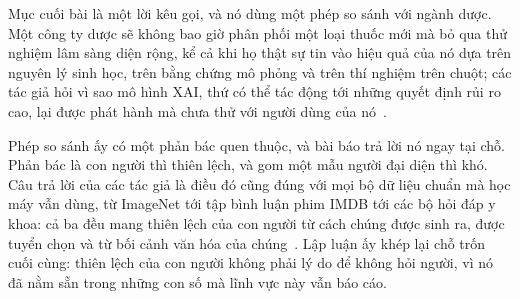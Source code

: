 %
Mục cuối bài là một lời kêu gọi, và nó dùng một phép so sánh với ngành dược.
Một công ty dược sẽ không bao giờ phân phối một loại thuốc mới mà bỏ qua thử
nghiệm lâm sàng diện rộng, kể cả khi họ thật sự tin vào hiệu quả của nó dựa
trên nguyên lý sinh học, trên bằng chứng mô phỏng và trên thí nghiệm trên
chuột; các tác giả hỏi vì sao mô hình XAI, thứ có thể tác động tới những quyết
định rủi ro cao, lại được phát hành mà chưa thử với người dùng của
nó~\autocite{p24humangap}.

Phép so sánh ấy có một phản bác quen thuộc, và bài báo trả lời nó ngay tại
chỗ. Phản bác là con người thì thiên lệch, và gom một mẫu người đại diện thì
khó. Câu trả lời của các tác giả là điều đó cũng đúng với mọi bộ dữ liệu chuẩn
mà học máy vẫn dùng, từ ImageNet tới tập bình luận phim IMDB tới các bộ hỏi
đáp y khoa: cả ba đều mang thiên lệch của con người từ cách chúng được sinh
ra, được tuyển chọn và từ bối cảnh văn hóa của chúng~\autocite{p24humangap}.
Lập luận ấy khép lại chỗ trốn cuối cùng: thiên lệch của con người không phải
lý do để không hỏi người, vì nó đã nằm sẵn trong những con số mà lĩnh vực này
vẫn báo cáo.

%
